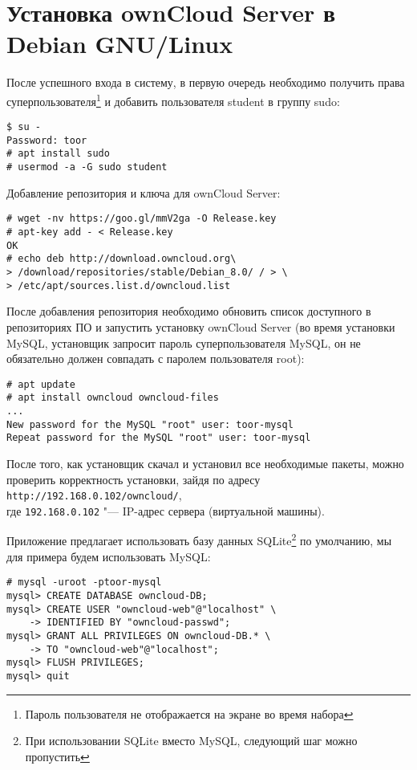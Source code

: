 \section{Установка ownCloud Server в Debian GNU/Linux} \label{pril:c}

После успешного входа в систему, в первую очередь необходимо получить права суперпользователя\footnote{Пароль пользователя не отображается на экране во время набора} и добавить пользователя student в группу sudo:
\begin{lstlisting}
$ su -
Password: toor
# apt install sudo
# usermod -a -G sudo student
\end{lstlisting}

Добавление репозитория и ключа для ownCloud Server:
\begin{lstlisting}
# wget -nv https://goo.gl/mmV2ga -O Release.key
# apt-key add - < Release.key
OK
# echo deb http://download.owncloud.org\
> /download/repositories/stable/Debian_8.0/ / > \
> /etc/apt/sources.list.d/owncloud.list
\end{lstlisting}

После добавления репозитория необходимо обновить список доступного в репозиториях ПО и запустить установку ownCloud Server (во время установки MySQL, установщик запросит пароль суперпользователя MySQL, он не обязательно должен совпадать с паролем пользователя root):
\begin{lstlisting}
# apt update
# apt install owncloud owncloud-files
...
New password for the MySQL "root" user: toor-mysql
Repeat password for the MySQL "root" user: toor-mysql
\end{lstlisting}

После того, как установщик скачал и установил все необходимые пакеты, можно проверить корректность установки, зайдя по адресу \texttt{http://192.168.0.102/owncloud/}, \\
где \texttt{192.168.0.102} "--- IP-адрес сервера (виртуальной машины).

Приложение предлагает использовать базу данных SQLite\footnote{При использовании SQLite вместо MySQL, следующий шаг можно пропустить} по умолчанию, мы для примера будем использовать MySQL:
\begin{lstlisting}
# mysql -uroot -ptoor-mysql
mysql> CREATE DATABASE owncloud-DB;
mysql> CREATE USER "owncloud-web"@"localhost" \
    -> IDENTIFIED BY "owncloud-passwd";
mysql> GRANT ALL PRIVILEGES ON owncloud-DB.* \
    -> TO "owncloud-web"@"localhost";
mysql> FLUSH PRIVILEGES;
mysql> quit
\end{lstlisting}

